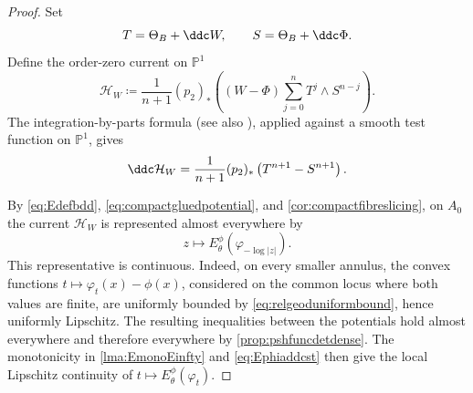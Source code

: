 \begin{proof}
    Set
    \[
        T=\Theta_B+\ddc W,\qquad S=\Theta_B+\ddc\Phi.
    \]
    Define the order-zero current on $\mathbb{P}^1$
    \begin{equation}\label{eq:compactrelativeenergycurrent}
        \mathcal{H}_W\coloneqq\frac{1}{n+1}(p_2)_*\left((W-\Phi)\sum_{j=0}^n T^j\wedge S^{n-j}\right).
    \end{equation}
    The integration-by-parts formula \cite{Xia19b} (see also \cite[Theorem~17.1.3 and the proof of Theorem~17.7.3]{FPT}), applied against a smooth test function on $\mathbb{P}^1$, gives
    \begin{equation}\label{eq:compactrelativeenergyddc}
        \ddc\mathcal{H}_W
        =\frac{1}{n+1}(p_2)_*\left(T^{n+1}-S^{n+1}\right).
    \end{equation}

    By \eqref{eq:Edefbdd}, \eqref{eq:compactgluedpotential}, and \cref{cor:compactfibreslicing}, on $A_0$ the current $\mathcal{H}_W$ is represented almost everywhere by
    \[
        z\longmapsto E_\theta^\phi(\varphi_{-\log|z|}).
    \]
    This representative is continuous. Indeed, on every smaller annulus, the convex functions $t\mapsto\varphi_t(x)-\phi(x)$, considered on the common locus where both values are finite, are uniformly bounded by \eqref{eq:relgeoduniformbound}, hence uniformly Lipschitz. The resulting inequalities between the potentials hold almost everywhere and therefore everywhere by \cref{prop:pshfuncdetdense}. The monotonicity in \cref{lma:EmonoEinfty} and \eqref{eq:Ephiaddcst} then give the local Lipschitz continuity of $t\mapsto E_\theta^\phi(\varphi_t)$.


\end{proof}

